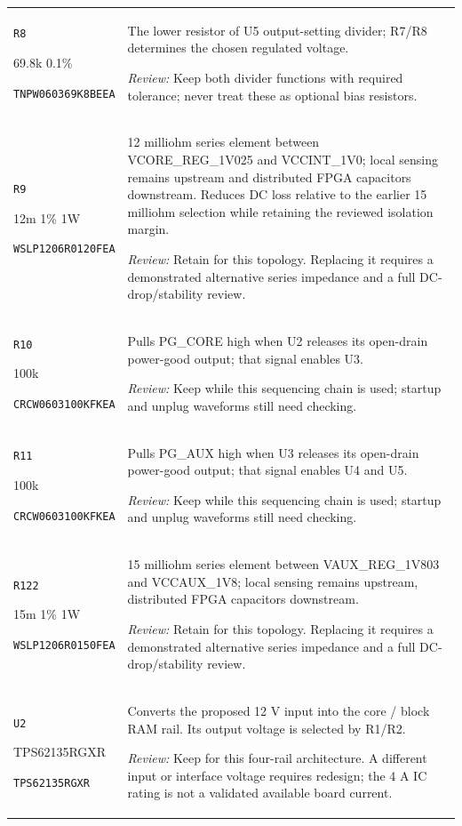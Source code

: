 \documentclass[10pt,a4paper]{article}
\begin{document}
\begin{longtable}{@{}P{46mm}P{117mm}@{}}
\nolinkurl{R8}\par 69.8k 0.1\%\par\scriptsize \nolinkurl{TNPW060369K8BEEA} & The lower resistor of U5 output-setting divider; R7/R8 determines the chosen regulated voltage.\par\smallskip\textit{Review:} Keep both divider functions with required tolerance; never treat these as optional bias resistors. \\
\nolinkurl{R9}\par 12m 1\% 1W\par\scriptsize \nolinkurl{WSLP1206R0120FEA} & 12 milliohm series element between VCORE\_REG\_1V025 and VCCINT\_1V0; local sensing remains upstream and distributed FPGA capacitors downstream. Reduces DC loss relative to the earlier 15 milliohm selection while retaining the reviewed isolation margin.\par\smallskip\textit{Review:} Retain for this topology. Replacing it requires a demonstrated alternative series impedance and a full DC-drop/stability review. \\
\nolinkurl{R10}\par 100k\par\scriptsize \nolinkurl{CRCW0603100KFKEA} & Pulls PG\_CORE high when U2 releases its open-drain power-good output; that signal enables U3.\par\smallskip\textit{Review:} Keep while this sequencing chain is used; startup and unplug waveforms still need checking. \\
\nolinkurl{R11}\par 100k\par\scriptsize \nolinkurl{CRCW0603100KFKEA} & Pulls PG\_AUX high when U3 releases its open-drain power-good output; that signal enables U4 and U5.\par\smallskip\textit{Review:} Keep while this sequencing chain is used; startup and unplug waveforms still need checking. \\
\nolinkurl{R122}\par 15m 1\% 1W\par\scriptsize \nolinkurl{WSLP1206R0150FEA} & 15 milliohm series element between VAUX\_REG\_1V803 and VCCAUX\_1V8; local sensing remains upstream, distributed FPGA capacitors downstream.\par\smallskip\textit{Review:} Retain for this topology. Replacing it requires a demonstrated alternative series impedance and a full DC-drop/stability review. \\
\nolinkurl{U2}\par TPS62135RGXR\par\scriptsize \nolinkurl{TPS62135RGXR} & Converts the proposed 12 V input into the core / block RAM rail. Its output voltage is selected by R1/R2.\par\smallskip\textit{Review:} Keep for this four-rail architecture. A different input or interface voltage requires redesign; the 4 A IC rating is not a validated available board current. \\

\end{longtable}
\end{document}

